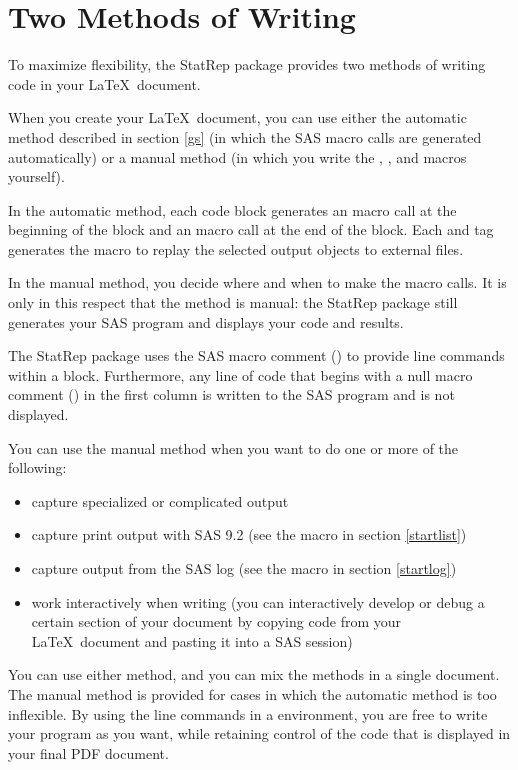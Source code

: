\documentclass[article,oneside]{memoir}
\newcommand*{\StatRep}{\textsf{StatRep}\xspace}
\begin{document}
\section{Two Methods of Writing}
  To maximize flexibility, the \StatRep package provides two methods of writing code in your
\LaTeX\ document.

When you create your \LaTeX\ document, you can use either the automatic method described in
section \ref{gs} (in which the SAS macro calls are generated automatically) or a manual
method (in which you write the , , and  macros yourself).

In the automatic method, each  code block generates an  macro call at the beginning
of the block and an  macro call at the end of the block.
Each  and  tag generates the 
macro to replay the selected output objects to external files.

In the manual method, you decide where and when to make the macro calls.
It is only in this respect that the method is manual: the
\StatRep package still generates your SAS program and displays your code and results.

The \StatRep package uses
  the SAS macro comment () to provide line
  commands within a 
  block. Furthermore, any line of code that begins with a null macro
  comment (\Code{\%*;})
  in the first column is written to
  the SAS program and is not displayed.

You can use the manual method when you want to do one or more of the following:
\begin{itemize}
\item capture specialized or complicated output
\item capture print output with SAS 9.2 (see the  macro in section \ref{startlist})
\item capture output from the SAS log (see the  macro in section \ref{startlog})
\item work interactively when writing (you can interactively develop or debug a
        certain section of your document by copying code from
        your \LaTeX\ document and pasting it into a SAS session)
\end{itemize}

 You can use either method, and you can
mix the methods in a single document. The manual method is provided for cases in which the
automatic method is too inflexible. By using the line commands in a  environment,
you are free to write your program as you want, while retaining control of the code that is
displayed in your final PDF document.
\end{document}
